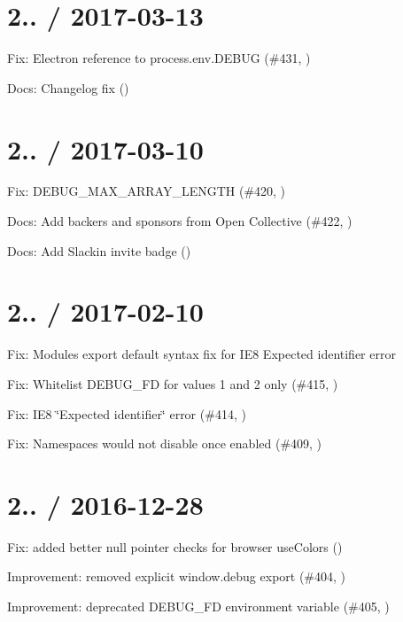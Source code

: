 \section*{2.. / 2017-\/03-\/13 }


\begin{DoxyItemize}
\item Fix\+: Electron reference to {\ttfamily process.\+env.\+D\+E\+B\+UG} (\#431, )
\item Docs\+: Changelog fix ()
\end{DoxyItemize}

\section*{2.. / 2017-\/03-\/10 }


\begin{DoxyItemize}
\item Fix\+: D\+E\+B\+U\+G\+\_\+\+M\+A\+X\+\_\+\+A\+R\+R\+A\+Y\+\_\+\+L\+E\+N\+G\+TH (\#420, )
\item Docs\+: Add backers and sponsors from Open Collective (\#422, )
\item Docs\+: Add Slackin invite badge ()
\end{DoxyItemize}

\section*{2.. / 2017-\/02-\/10 }


\begin{DoxyItemize}
\item Fix\+: Module\textquotesingle{}s {\ttfamily export default} syntax fix for I\+E8 {\ttfamily Expected identifier} error
\item Fix\+: Whitelist D\+E\+B\+U\+G\+\_\+\+FD for values 1 and 2 only (\#415, )
\item Fix\+: I\+E8 \char`\"{}\+Expected identifier\char`\"{} error (\#414, )
\item Fix\+: Namespaces would not disable once enabled (\#409, )
\end{DoxyItemize}

\section*{2.. / 2016-\/12-\/28 }


\begin{DoxyItemize}
\item Fix\+: added better null pointer checks for browser use\+Colors ()
\item Improvement\+: removed explicit {\ttfamily window.\+debug} export (\#404, )
\item Improvement\+: deprecated {\ttfamily D\+E\+B\+U\+G\+\_\+\+FD} environment variable (\#405, )
\end{DoxyItemize}

